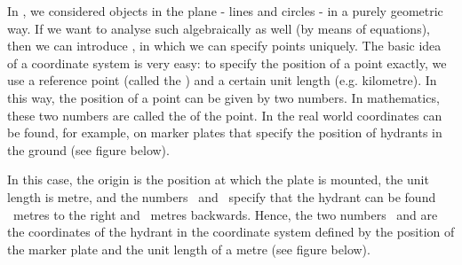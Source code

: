 
\Mtikzexternalize




\begin{MSectionStart}

\MModstartBox
\end{MSectionStart}


\begin{MIntro}

In , we considered objects in the plane - lines and circles - in a purely geometric way. If we want to analyse such algebraically as well (by means of equations), then we can
introduce , in which we can specify points uniquely. The basic idea of a coordinate system is very easy: to specify the
position of a point exactly, we use a reference point (called the ) and a certain 
unit length (e.g. kilometre). In this way, the position of a point can be given by two numbers.
In mathematics, these two numbers are called the  of the point. In the real world coordinates can be 
found, for example, on marker plates that specify the position of hydrants in the ground (see figure below).
\begin{center}
\end{center}

In this case, the origin is the position at which the plate is mounted, the unit length is metre, and the numbers
\ and \ specify that the hydrant can be found ~metres to the right and ~metres 
backwards. Hence, the two numbers \ and  are the coordinates of the hydrant in the coordinate
system defined by the position of the marker plate and the unit length of a metre (see figure below).


\end{MIntro}
